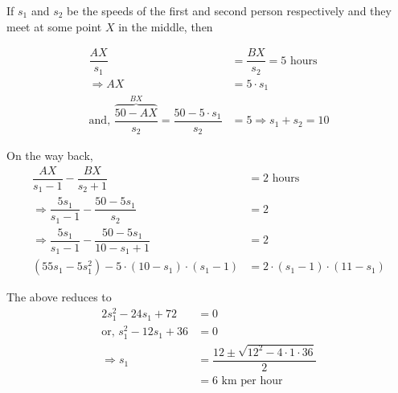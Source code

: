 \begin{solution}
	If $s_1$ and $s_2$ be the speeds of the first and second person respectively and they
	meet at some point $X$ in the middle, then 
	
	\begin{align}
		\dfrac{AX}{s_1} &= \dfrac{BX}{s_2} = 5\text{ hours} \\
		\Rightarrow AX &= 5\cdot s_1 \\
		\text{and, } \dfrac{\overbrace{50-AX}^{BX}}{s_2} = \dfrac{50-5\cdot s_1}{s_2} &= 5 \Rightarrow s_1 + s_2 = 10
	\end{align}
	
	On the way back, 
	\begin{align}
		\dfrac{AX}{s_1 - 1} - \dfrac{BX}{s_2 + 1} &= 2\text{ hours} \\
		\Rightarrow \dfrac{5s_1}{s_1 - 1} - \dfrac{50 - 5s_1}{s_2} &= 2 \\
		\Rightarrow \dfrac{5s_1}{s_1 - 1} - \dfrac{50 - 5s_1}{10-s_1+1} &= 2 \\
		(55s_1 - 5s_1^2) - 5\cdot(10-s_1)\cdot(s_1-1) &= 2\cdot(s_1-1)\cdot(11-s_1)
	\end{align}
	
	The above reduces to 
	\begin{align}
		2s_1^2 - 24s_1 + 72 &= 0 \\
		\text{or, }s_1^2 -12s_1 + 36 &= 0 \\
		\Rightarrow s_1 &= \dfrac{12\pm\sqrt{12^2 - 4\cdot 1 \cdot 36}}{2} \\
		                &= 6\text{ km per hour}
	\end{align}
	
\end{solution}


